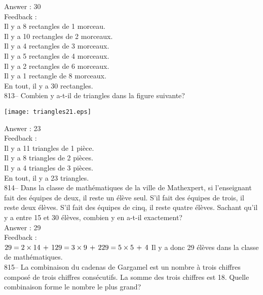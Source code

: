 ﻿\documentclass[letterpaper, 12pt]{article}
\begin{document}
Answer : 30\\

Feedback : \\
Il y a 8 rectangles de 1 morceau.\\
Il y a 10 rectangles de 2 morceaux.\\
Il y a 4 rectangles de 3 morceaux.\\
Il y a 5 rectangles de 4 morceaux.\\
Il y a 2 rectangles de 6 morceaux.\\
Il y a 1 rectangle de 8 morceaux.\\
En tout, il y a 30 rectangles.\\

813-- Combien y a-t-il de triangles dans la figure suivante?\\
    \begin{center}
    \texttt{[image: triangles21.eps]}
    \end{center}

Answer : 23\\

Feedback : \\
Il y a 11 triangles de 1 pi\`ece.\\
Il y a 8 triangles de 2 pi\`eces.\\
Il y a 4 triangles de 3 pi\`eces.\\
En tout, il y a 23 triangles.\\

814--  Dans la classe de math\'ematiques de la ville de  Mathexpert, si
l'enseignant fait des \'equipes de deux, il reste un \'el\`eve seul.  S'il
fait des \'equipes de trois, il reste deux \'el\`eves.  S'il fait des
\'equipes de cinq, il reste quatre \'el\`eves. Sachant qu'il y a entre 15 et
30 \'el\`eves, combien y en a-t-il exactement?\\

Answer : 29\\

Feedback : \\
$29=2\times14\,+\,1\\
29=3\times9\,+\,2\\
29=5\times5\,+\,4\\$
Il y a donc 29 \'el\`eves dans la classe de math\'ematiques.  \\

815-- La combinaison du cadenas de Gargamel est un nombre \`a trois chiffres
compos\'e de trois chiffres cons\'ecutifs.  La somme des trois chiffres est
18.  Quelle combinaison forme le nombre le plus grand?\\
\end{document}
